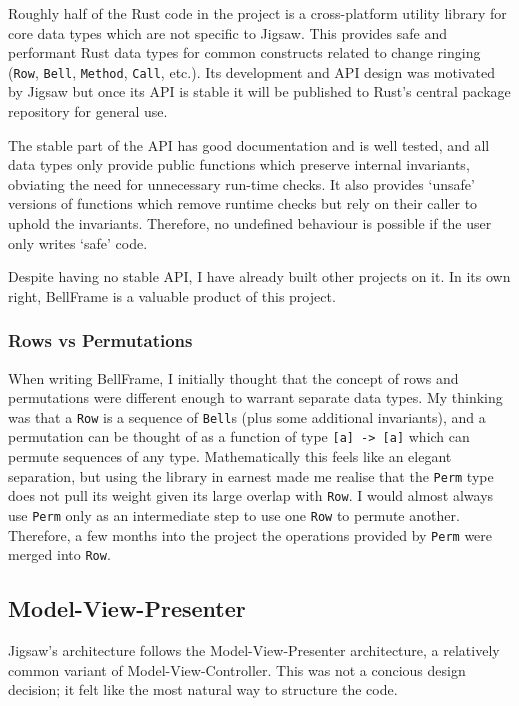 \documentclass[12pt]{article}
\begin{document}
Roughly half of the Rust code in the project is a cross-platform utility library for core data types
which are not specific to Jigsaw.  This provides safe and performant Rust data types for common
constructs related to change ringing (\verb|Row|, \verb|Bell|, \verb|Method|, \verb|Call|, etc.).
Its development and API design was motivated by Jigsaw but once its API is stable it will be
published to Rust's central package repository for general use.

The stable part of the API has good documentation and is well tested, and all data types only
provide public functions which preserve internal invariants, obviating the need for
unnecessary run-time checks.  It also provides `unsafe' versions of functions which remove runtime checks but
rely on their caller to uphold the invariants.  Therefore, no undefined behaviour is possible if
the user only writes `safe' code.

Despite having no stable API, I have already built other projects on it.  In its own right,
BellFrame is a valuable product of this project.

\subsubsection{Rows vs Permutations}

When writing BellFrame, I initially thought that the concept of rows and permutations were different
enough to warrant separate data types.  My thinking was that a \verb|Row| is a sequence of
\verb|Bell|s (plus some additional invariants), and a permutation can be thought of as a function of
type \verb|[a] -> [a]| which can permute sequences of any type.  Mathematically this feels like an
elegant separation, but using the library in earnest made me realise that the \verb|Perm| type does not
pull its weight given its large overlap with \verb|Row|.  I would almost always use
\verb|Perm| only as an intermediate step to use one \verb|Row| to permute another.  Therefore, a few
months into the project the operations provided by \verb|Perm| were merged into \verb|Row|.

\subsection{Model-View-Presenter}

Jigsaw's architecture follows the Model-View-Presenter architecture, a relatively common variant of
Model-View-Controller.  This was not a concious design decision; it felt like the most natural way
to structure the code.
\end{document}
